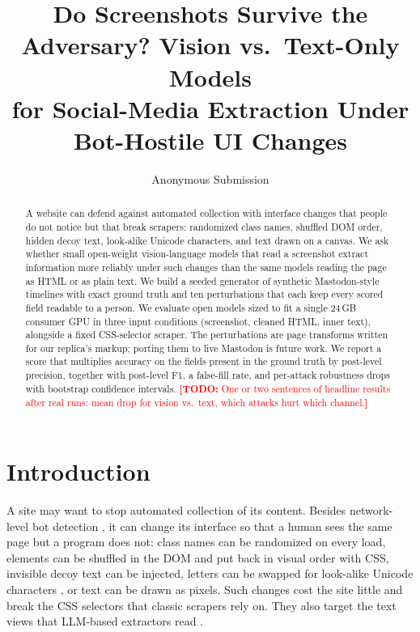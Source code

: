 \documentclass[letterpaper,10pt,twocolumn]{article}
\title{Do Screenshots Survive the Adversary? Vision vs.\ Text-Only Models\\
for Social-Media Extraction Under Bot-Hostile UI Changes}
\author{Anonymous Submission}
\date{}
\newcommand{\todo}[1]{\textcolor{red}{\textbf{[TODO:} #1\textbf{]}}}
\begin{document}
\maketitle

\begin{abstract}
A website can defend against automated collection with interface
changes that people do not notice but that break scrapers: randomized class
names, shuffled DOM order, hidden decoy text, look-alike Unicode characters,
and text drawn on a canvas. We ask whether small open-weight vision-language
models that read a screenshot extract information more reliably under such
changes than the same models reading the page as HTML or as plain text. We
build a seeded generator of synthetic Mastodon-style timelines with exact
ground truth and ten perturbations that each keep every scored field readable
to a person. We evaluate open models sized to fit a single 24\,GB consumer GPU
in three input conditions (screenshot, cleaned HTML, inner text), alongside a
fixed CSS-selector scraper. The perturbations are page transforms written for
our replica's markup; porting them to live Mastodon is future work. We report a
score that multiplies accuracy on the fields present in the ground truth by
post-level precision, together with post-level F1, a false-fill rate, and
per-attack robustness drops with bootstrap confidence intervals.
\todo{One or two sentences of headline results after real runs: mean drop for
vision vs.\ text, which attacks hurt which channel.}
\end{abstract}

\section{Introduction}

A site may want to stop automated collection of its content. Besides
network-level bot detection \citep{venugopalan2024fpinconsistent}, it can
change its interface so that a human sees the same page but a program does not:
class names can be randomized on every load, elements can be shuffled in the
DOM and put back in visual order with CSS, invisible decoy text can be injected,
letters can be swapped for look-alike Unicode characters
\citep{boucher2022badcharacters}, or text can be drawn as pixels. Such changes
cost the site little and break the CSS selectors that classic scrapers rely on.
They also target the text views that LLM-based extractors read
\citep{huang2024autoscraper,kim2025nexteval}.
\end{document}
